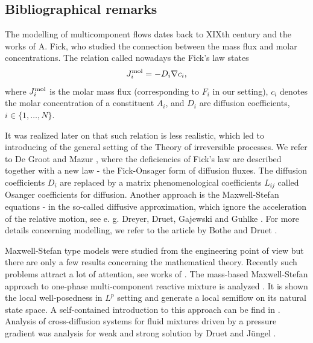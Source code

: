 \documentclass[11pt]{article}
\numberwithin{equation}{section}
\numberwithin{tw}{section}
\begin{document}
\subsection{Bibliographical remarks}
The modelling of multicomponent flows dates back to XIXth century and the works of A. Fick, who studied the connection between the mass flux and molar concentrations. The relation called nowadays the Fick's law states
\begin{equation}\label{Fick}
J_i^{\rm mol}= - D_i \nabla c_i,
\end{equation}
where $J_i^{\rm mol}$ is the molar mass flux (corresponding to $F_i$ in our setting), $c_i$ denotes the molar concentration of a constituent $A_i$, and $D_i$ are diffusion coefficients, $i\in\{1,\dots,N\}$.

It was realized later on that such relation is less realistic, which led to introducing of the general setting of the Theory of irreversible processes. We  refer to De Groot and Mazur \cite{DG-M}, where the deficiencies of Fick's law are described together with a new law - the Fick-Onsager form of diffusion fluxes. The diffusion coefficients $D_i$ are replaced by a matrix phenomenological coefficients $L_{ij}$ called Osanger coefficients for diffusion. Another approach is the Maxwell-Stefan equations - in the so-called diffusive approximation, which ignore the acceleration of the relative motion, see e. g. Dreyer, Druet, Gajewski and  Guhlke \cite{DDGG}. For more details concerning modelling, we refer to the article by Bothe and Druet \cite{BD}.

Maxwell-Stefan type models  were studied from the engineering point of view but there are only a few results concerning the mathematical theory. Recently such problems attract a lot of attention, see works of \cite{B,BGS,JS}. The mass-based Maxwell-Stefan approach to one-phase multi-component reactive mixture is analyzed \cite{HMPW}. It is shown the local well-posedness in $L^p$ setting and generate a local semiflow on its natural state space. A self-contained introduction to this approach can be find in \cite{J}.
Analysis of cross-diffusion systems for fluid mixtures driven by a pressure gradient  was analysis for weak and strong solution by Druet and J\"ungel \cite{DJ}.
\end{document}
